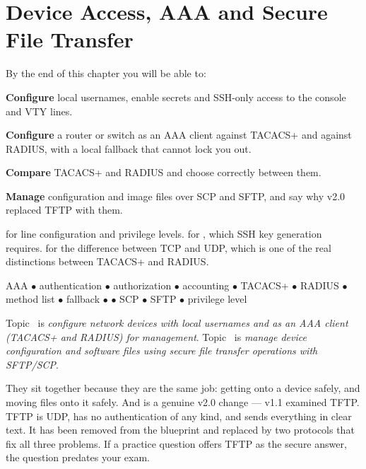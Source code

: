 \chapter{Device Access, AAA and Secure File Transfer}\label{ch:aaa}

\begin{outcomes}
By the end of this chapter you will be able to:
\begin{tight}
  \item \textbf{Configure} local usernames, enable secrets and SSH-only access to
        the console and VTY lines.
  \item \textbf{Configure} a router or switch as an AAA client against TACACS+ and
        against RADIUS, with a local fallback that cannot lock you out.
  \item \textbf{Compare} TACACS+ and RADIUS and choose correctly between them.
  \item \textbf{Manage} configuration and image files over SCP and SFTP, and say
        why v2.0 replaced TFTP with them.
\end{tight}
\end{outcomes}

\begin{prereq}
 for line configuration and privilege levels.  for
, which SSH key generation requires.  for
the difference between TCP and UDP, which is one of the real distinctions between
TACACS+ and RADIUS.
\end{prereq}

\begin{keyterms}
AAA $\bullet$ authentication $\bullet$ authorization $\bullet$ accounting
$\bullet$ TACACS+ $\bullet$ RADIUS $\bullet$ method list $\bullet$ fallback
$\bullet$  $\bullet$ SCP $\bullet$ SFTP $\bullet$ privilege
level
\end{keyterms}

\begin{examnote}
Topic~ is \emph{configure network devices with local usernames and as an
AAA client (TACACS+ and RADIUS) for management}. Topic~ is \emph{manage
device configuration and software files using secure file transfer operations
with SFTP/SCP}.

They sit together because they are the same job: getting onto a device safely,
and moving files onto it safely. And  is a genuine v2.0 change --- v1.1
examined TFTP. TFTP is UDP, has no authentication of any kind, and sends
everything in clear text. It has been removed from the blueprint and replaced by
two protocols that fix all three problems. If a practice question offers TFTP as
the secure answer, the question predates your exam.
\end{examnote}

